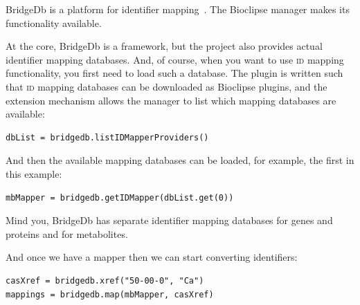 \documentclass[a5paper, 10pt]{memoir}
\begin{document}
\begin{refsection}
\noindent
BridgeDb is a platform for identifier mapping~\cite{van2010bridgedb}. The
Bioclipse manager makes its functionality available.

At the core, BridgeDb is a framework, but the project also provides actual
identifier mapping databases. And, of course, when you want to use \textsc{id}
mapping functionality, you first need to load such a database. The plugin is
written such that \textsc{id} mapping databases can be downloaded as Bioclipse
plugins, and the extension mechanism allows the manager to list which mapping
databases are available:
\begin{Verbatim}
dbList = bridgedb.listIDMapperProviders()
\end{Verbatim}
And then the available mapping databases can be loaded, for example, the first
in this example:

\begin{Verbatim}
mbMapper = bridgedb.getIDMapper(dbList.get(0))
\end{Verbatim}
Mind you, BridgeDb has separate identifier mapping databases for genes and
proteins and for metabolites.

And once we have a mapper then we can start converting
identifiers:

\begin{Verbatim}
casXref = bridgedb.xref("50-00-0", "Ca")
mappings = bridgedb.map(mbMapper, casXref)
\end{Verbatim}

\printbibliography[heading=subbibliography]
\end{refsection}
\end{document}
